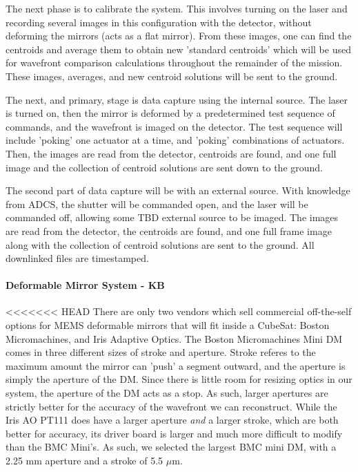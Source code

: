 \documentclass[12pt]{article}
\begin{document}
The next phase is to calibrate the system. This involves turning on the laser and recording several images in this configuration with the detector, without deforming the mirrors (acts as a flat mirror). From these images, one can find the centroids and average them to obtain new 'standard centroids' which will be used for wavefront comparison calculations throughout the remainder of the mission. These images, averages, and new centroid solutions will be sent to the ground.

The next, and primary, stage is data capture using the internal source. The laser is turned on, then the mirror is deformed by a predetermined test sequence of commands, and the wavefront is imaged on the detector. The test sequence will include 'poking' one actuator at a time, and 'poking' combinations of actuators. Then, the images are read from the detector, centroids are found, and one full image and the collection of centroid solutions are sent down to the ground.

The second part of data capture will be with an external source. With knowledge from ADCS, the shutter will be commanded open, and the laser will be commanded off, allowing some TBD external source to be imaged. The images are read from the detector, the centroids are found, and one full frame image along with the collection of centroid solutions are sent to the ground. All downlinked files are timestamped.

\paragraph{Deformable Mirror System - KB}

<<<<<<< HEAD
There are only two vendors which sell commercial off-the-self options for MEMS deformable mirrors that will fit inside a CubeSat: Boston Micromachines, and Iris Adaptive Optics. The Boston Micromachines Mini DM comes in three different sizes of stroke and aperture. Stroke
referes to the maximum amount the mirror can 'push' a segment outward, and the aperture is simply the aperture of the DM. Since there is little room for resizing optics in our system, the aperture of the DM
acts as a stop. As such, larger apertures are strictly better for the accuracy of the wavefront we can reconstruct. While the Iris AO PT111 does have a larger aperture \emph{and} a larger stroke, which are both
better for accuracy, its driver board is larger and much more difficult to modify than the BMC Mini's. As such, we selected the largest BMC mini DM, with a 2.25 mm aperture and a stroke of 5.5 $\mu \text{m}$.
\end{document}

